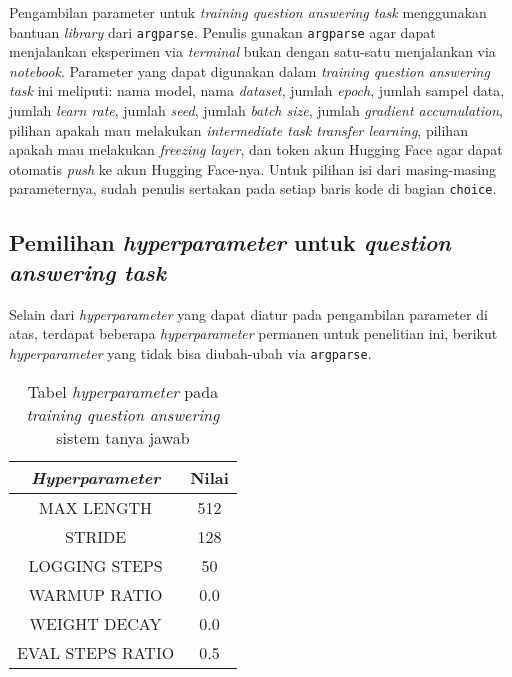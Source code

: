 Pengambilan parameter untuk \emph{training question answering task} menggunakan bantuan \emph{library} dari \texttt{argparse}. Penulis gunakan \texttt{argparse} agar dapat menjalankan eksperimen via \emph{terminal} bukan dengan satu-satu menjalankan via \emph{notebook}. Parameter yang dapat digunakan dalam \emph{training question answering task} ini meliputi: nama model, nama \emph{dataset}, jumlah \emph{epoch}, jumlah sampel data, jumlah \emph{learn rate}, jumlah \emph{seed}, jumlah \emph{batch size}, jumlah \emph{gradient accumulation}, pilihan apakah mau melakukan \emph{intermediate task transfer learning}, pilihan apakah mau melakukan \emph{freezing layer}, dan token akun Hugging Face agar dapat otomatis \emph{push} ke akun Hugging Face-nya. Untuk pilihan isi dari masing-masing parameternya, sudah penulis sertakan pada setiap baris kode di bagian \texttt{choice}.

\subsection{Pemilihan \emph{hyperparameter} untuk \emph{question answering task}}
Selain dari \emph{hyperparameter} yang dapat diatur pada pengambilan parameter di atas, terdapat beberapa \emph{hyperparameter} permanen untuk penelitian ini, berikut \emph{hyperparameter} yang tidak bisa diubah-ubah via \texttt{argparse}.

\begin{table}[h]
\centering
\begin{tabular}{||c | c||} 
 \hline
 \emph{Hyperparameter} & Nilai \\ [0.5ex] 
 \hline\hline
 MAX LENGTH & 512 \\ 
 STRIDE & 128 \\
 LOGGING STEPS & 50 \\
 WARMUP RATIO & 0.0 \\
 WEIGHT DECAY & 0.0 \\ 
 EVAL STEPS RATIO & 0.5 \\ [1ex] 
 \hline\hline
\end{tabular}
\caption{Tabel \emph{hyperparameter} pada \emph{training question answering} sistem tanya jawab}
\end{table}


